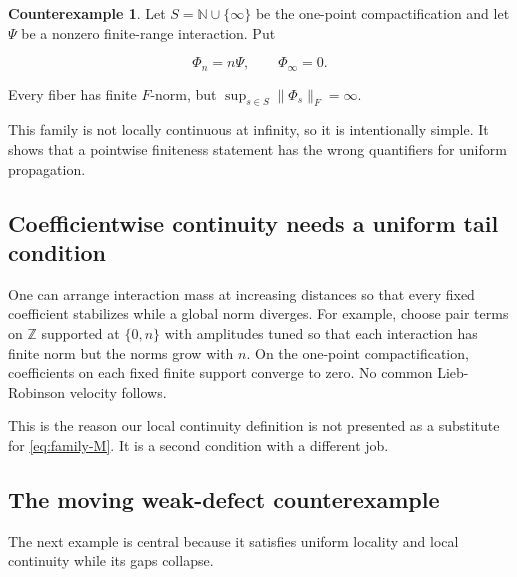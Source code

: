 \documentclass[12pt]{article}
\theoremstyle{definition}
\newtheorem{counterexample}[theorem]{Counterexample}
\theoremstyle{remark}
\begin{document}
\begin{counterexample}
Let $S=\mathbb N\cup\{\infty\}$ be the one-point compactification and let
$\Psi$ be a nonzero finite-range interaction.  Put

\begin{equation}
  \Phi_n=n\Psi,
  \qquad
  \Phi_\infty=0.
\end{equation}

Every fiber has finite $F$-norm, but
$\sup_{s\in S}\|\Phi_s\|_F=\infty$.
\end{counterexample}

This family is not locally continuous at infinity, so it is intentionally
simple.  It shows that a pointwise finiteness statement has the wrong
quantifiers for uniform propagation.

\subsection{Coefficientwise continuity needs a uniform tail condition}

One can arrange interaction mass at increasing distances so that every fixed
coefficient stabilizes while a global norm diverges.  For example, choose
pair terms on $\mathbb Z$ supported at $\{0,n\}$ with amplitudes tuned so that
each interaction has finite norm but the norms grow with $n$.  On the
one-point compactification, coefficients on each fixed finite support converge
to zero.  No common Lieb-Robinson velocity follows.

This is the reason our local continuity definition is not presented as a
substitute for \cref{eq:family-M}.  It is a second condition with a different
job.

\subsection{The moving weak-defect counterexample}

The next example is central because it satisfies uniform locality and local
continuity while its gaps collapse.
\end{document}
